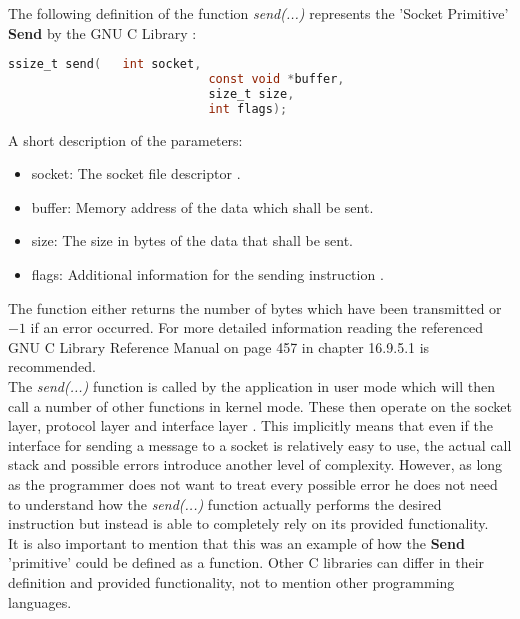 \documentclass[xcolor=dvipsnames]{article}
\begin{document}
\noindent The following definition of the function \textit{send(...)} represents the 'Socket Primitive' \textbf{Send} by the GNU C Library \cite[p. 457, ch. 16.9.5.1]{GNU_C_library_manual}:

\begin{lstlisting}[language=C, numbers=none]
ssize_t send(	int socket, 
							const void *buffer, 
							size_t size, 
							int flags);
\end{lstlisting}

\noindent A short description of the parameters:

\begin{itemize}
\item socket: The socket file descriptor \cite[p. 427, ch. 16.2]{GNU_C_library_manual}.
\item buffer: Memory address of the data which shall be sent.
\item size: The size in bytes of the data that shall be sent.
\item flags: Additional information for the sending instruction \cite[p. 459, ch. 16.9.5.3]{GNU_C_library_manual}.
\end{itemize}

\noindent The function either returns the number of bytes which have been transmitted or $-1$ if an error occurred. For more detailed information reading the referenced GNU C Library Reference Manual \cite{GNU_C_library_manual} on page 457 in chapter 16.9.5.1 is recommended.\\

\noindent The \textit{send(...)} function is called by the application in user mode which will then call a number of other functions in kernel mode. These then operate on the socket layer, protocol layer and interface layer \cite[p. 2, 16]{IBM_Anupama}. This implicitly means that even if the interface for sending a message to a socket is relatively easy to use, the actual call stack and possible errors introduce another level of complexity. However, as long as the programmer does not want to treat every possible error he does not need to understand how the \textit{send(...)} function actually performs the desired instruction but instead is able to completely rely on its provided functionality.\\

\noindent It is also important to mention that this was an example of how the \textbf{Send} 'primitive' could be defined as a function. Other C libraries can differ in their definition and provided functionality, not to mention other programming languages.
\end{document}
